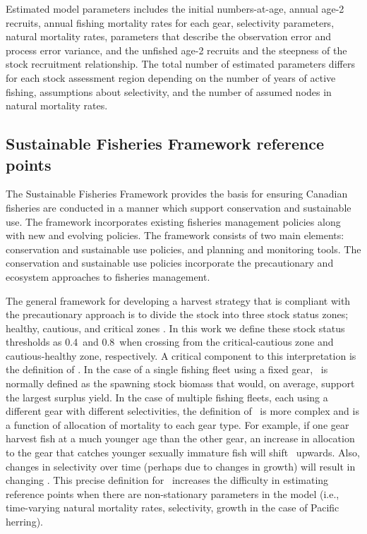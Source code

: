 	Estimated model parameters includes the initial numbers-at-age, annual age-2 recruits, annual fishing mortality rates for each gear, selectivity parameters, natural mortality rates, parameters that describe the observation error and process error variance, and the unfished age-2 recruits and the steepness of the stock recruitment relationship.  The total number of estimated parameters differs for each stock assessment region depending on the number of years of active fishing, assumptions about selectivity, and the number of assumed nodes in natural mortality rates.  
	
	\subsection{Sustainable Fisheries Framework reference points}

The Sustainable Fisheries Framework provides the basis for ensuring Canadian fisheries are conducted in a manner which support conservation and sustainable use. The framework incorporates existing fisheries management policies along with new and evolving policies.  The framework consists of two main elements: conservation and sustainable use policies, and planning and monitoring tools.  The conservation and sustainable use policies incorporate the precautionary and ecosystem approaches to fisheries management. 


The general framework for developing a harvest strategy that is compliant with the precautionary approach is to divide the stock into three stock status zones; healthy, cautious, and critical zones \citep{dfo2006}.  In this work we define these stock status thresholds as 0.4\bmsy\ and 0.8\bmsy\ when crossing from the critical-cautious zone and cautious-healthy zone, respectively.  A critical component to this interpretation is the definition of \bmsy.  In the case of a single fishing fleet using a fixed gear, \bmsy\ is normally defined as the spawning stock biomass that would, on average, support the largest surplus yield.  In the case of multiple fishing fleets, each using a different gear with different selectivities, the definition of \bmsy\ is more complex and is a function of allocation of mortality to each gear type.  For example, if one gear harvest fish at a much younger age than the other gear, an increase in allocation to the gear that catches younger sexually immature fish will shift \bmsy\ upwards. Also, changes in selectivity over time (perhaps due to changes in growth) will result in changing \bmsy.  This precise definition for \bmsy\ increases the difficulty in estimating reference points when there are non-stationary parameters in the model (i.e., time-varying natural mortality rates, selectivity, growth in the case of Pacific herring).
	
